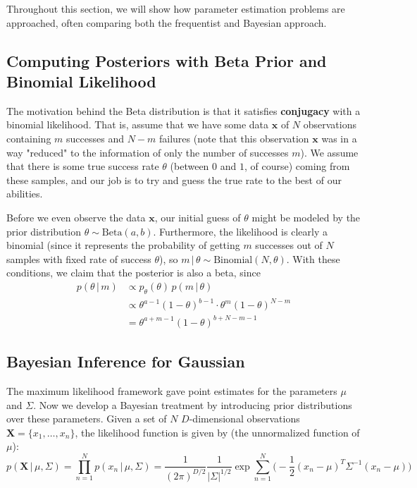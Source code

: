 \documentclass{article}
\begin{document}
  Throughout this section, we will show how parameter estimation problems are approached, often comparing both the frequentist and Bayesian approach.

  \subsection{Computing Posteriors with Beta Prior and Binomial Likelihood}

    The motivation behind the Beta distribution is that it satisfies \textbf{conjugacy} with a binomial likelihood. That is, assume that we have some data $\mathbf{x}$ of $N$ observations containing $m$ successes and $N-m$ failures (note that this observation $\mathbf{x}$ was in a way "reduced" to the information of only the number of successes $m$). We assume that there is some true success rate $\theta$ (between $0$ and $1$, of course) coming from these samples, and our job is to try and guess the true rate to the best of our abilities.

    Before we even observe the data $\mathbf{x}$, our initial guess of $\theta$ might be modeled by the prior distribution $\theta \sim \text{Beta}(a, b)$. Furthermore, the likelihood is clearly a binomial (since it represents the probability of getting $m$ successes out of $N$ samples with fixed rate of success $\theta$), so $m\,|\,\theta \sim \text{Binomial}(N, \theta)$. With these conditions, we claim that the posterior is also a beta, since
    \begin{align*}
      p(\theta\,|\, m) & \propto p_\theta (\theta) \, p(m\,|\,\theta) \\
      & \propto \theta^{a - 1} (1 - \theta)^{b - 1} \cdot \theta^m (1 - \theta)^{N - m} \\
      & = \theta^{a + m - 1} (1 - \theta)^{b + N - m - 1}
    \end{align*}

  \subsection{Bayesian Inference for Gaussian}

    The maximum likelihood framework gave point estimates for the parameters $\mu$ and $\Sigma$. Now we develop a Bayesian treatment by introducing prior distributions over these parameters. Given a set of $N$ $D$-dimensional observations $\mathbf{X} = \{x_1, \ldots, x_n\}$, the likelihood function is given by (the unnormalized function of $\mu$):
    \begin{equation}
      p(\mathbf{X}\,|\,\mu, \Sigma) = \prod_{n=1}^N p(x_n\,|\,\mu, \Sigma) = \frac{1}{(2\pi)^{D/2}} \frac{1}{|\Sigma|^{1/2}} \exp \sum_{n=1}^N \bigg(-\frac{1}{2} (x_n - \mu)^T \Sigma^{-1} (x_n - \mu)\bigg)
    \end{equation}
\end{document}
